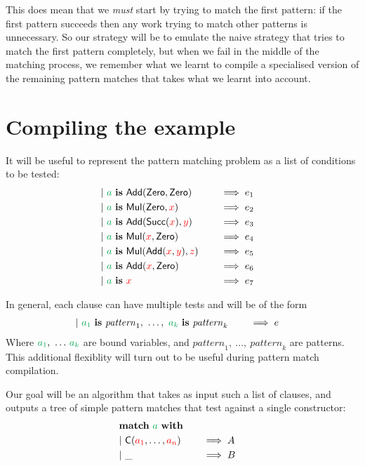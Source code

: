 \documentclass[a4paper, 11pt]{article}
\theoremstyle{definition}
\begin{document}
This does mean that we \emph{must} start by trying to match the first pattern: if the first pattern succeeds then any work trying to match other patterns is unnecessary. So our strategy will be to emulate the naive strategy that tries to match the first pattern completely, but when we fail in the middle of the matching process, we remember what we learnt to compile a specialised version of the remaining pattern matches that takes what we learnt into account.

\section{Compiling the example}

\newcommand{\is}{\mathbf{\ is\ }}

It will be useful to represent the pattern matching problem as a list of conditions to be tested:
\begin{alignat*}{4}
\clause{\ba \is \Add(\Zero, \Zero)}{e_1} \\
\clause{\ba \is \Mul(\Zero, \fvar{x})}{e_2} \\
\clause{\ba \is \Add(\Succ(\fvar x), \fvar y)}{e_3} \\
\clause{\ba \is \Mul(\fvar x, \Zero)}{e_4} \\
\clause{\ba \is \Mul(\Add(\fvar x, \fvar y), \fvar z)}{e_5} \\
\clause{\ba \is \Add(\fvar x, \Zero)}{e_6} \\
\clause{\ba \is \fvar x}{e_7} \\
\end{alignat*}

\newcommand{\patt}{\mathit{pattern}}
In general, each clause can have multiple tests and will be of the form
\begin{alignat*}{4}
  \clause{\bvar{a_1} \is \patt_1,\ \dots,\ \bvar{a_k} \is \patt_k}{e}
\end{alignat*}
Where $\bvar{a_1},\ \dots\, \bvar{a_k}$ are bound variables, and $\patt_1,\ \dots,\ \patt_k$ are patterns.
This additional flexiblity will turn out to be useful during pattern match compilation.

Our goal will be an algorithm that takes as input such a list of clauses, and outputs a tree of simple pattern matches that test against a single constructor:
\begin{alignat*}{4}
  \matchwith{\ba} \\
  \clause{\C(\fvar{a_1}, \dots, \fvar{a_n})}{A} \\
  \clause{\_}{B}
\end{alignat*}
\end{document}
